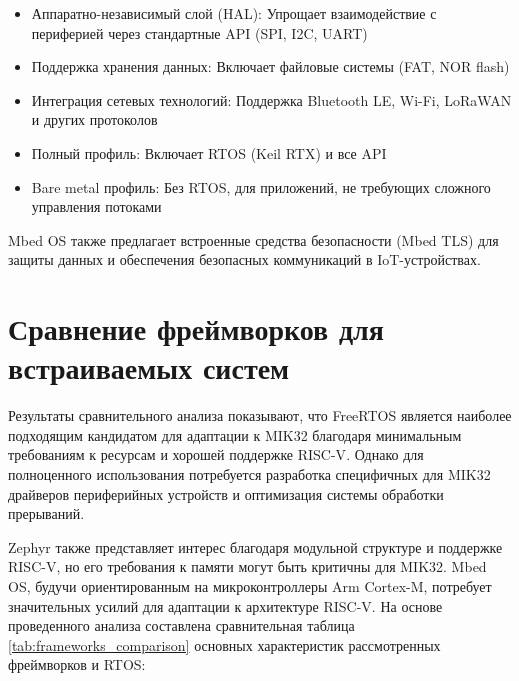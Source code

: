 \begin{itemize}
	\item Аппаратно-независимый слой (HAL): Упрощает взаимодействие с периферией через стандартные API (SPI, I2C, UART)
	\item Поддержка хранения данных: Включает файловые системы (FAT, NOR flash)
	\item Интеграция сетевых технологий: Поддержка Bluetooth LE, Wi-Fi, LoRaWAN и других протоколов
	\item Полный профиль: Включает RTOS (Keil RTX) и все API
	\item Bare metal профиль: Без RTOS, для приложений, не требующих сложного управления потоками
\end{itemize}

Mbed OS также предлагает встроенные средства безопасности (Mbed TLS) для защиты данных и обеспечения безопасных коммуникаций в IoT-устройствах.

\section{Сравнение фреймворков для встраиваемых систем}

Результаты сравнительного анализа показывают, что FreeRTOS является наиболее подходящим кандидатом для адаптации к MIK32 благодаря минимальным требованиям к ресурсам и хорошей поддержке RISC-V\cite{Harris2021}. Однако для полноценного использования потребуется разработка специфичных для MIK32 драйверов периферийных устройств и оптимизация системы обработки прерываний.

Zephyr также представляет интерес благодаря модульной структуре и поддержке RISC-V, но его требования к памяти могут быть критичны для MIK32\cite{MartinArch2024}. Mbed OS, будучи ориентированным на микроконтроллеры Arm Cortex-M, потребует значительных усилий для адаптации к архитектуре RISC-V. На основе проведенного анализа составлена сравнительная таблица \ref{tab:frameworks_comparison} основных характеристик рассмотренных фреймворков и RTOS:

